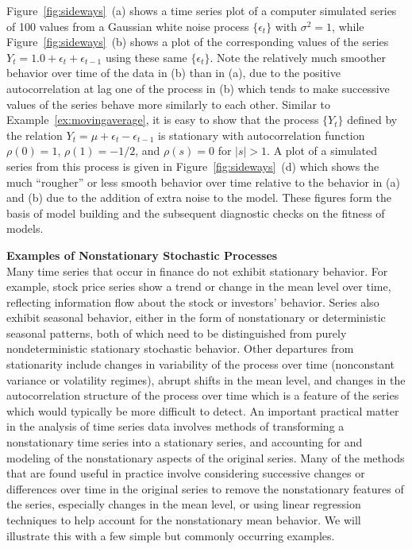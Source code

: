 \begin{ex}
Figure~\ref{fig:sideways}~(a) shows a time series plot of a computer simulated series of 100 values from a Gaussian white noise process $\{ \epsilon_t \}$ with $\sigma^2= 1$, while Figure~\ref{fig:sideways}~(b) shows a plot of the corresponding values of the series $Y_t = 1.0 + \epsilon_{t} + \epsilon_{t-1}$ using these same $\{\epsilon_t\}$.  Note the relatively much smoother behavior over time of the data in (b) than in (a), due to the positive autocorrelation at lag one of the process in (b) which tends to make successive values of the series behave more similarly to each other.  Similar to Example~\ref{ex:movingaverage}, it is easy to show that the process $\{Y_t\}$ defined by the relation $Y_t = \mu + \epsilon_{t} - \epsilon_{t-1}$ is stationary with autocorrelation function $\rho(0)=1$, $\rho(1)=-1/2$, and $\rho(s)=0$ for $|s|>1$. A plot of a simulated series from this process is given in Figure~\ref{fig:sideways}~(d) which shows the much ``rougher'' or less smooth behavior over time relative to the behavior  in (a) and (b) due to the addition of extra noise to the model. These figures form the basis of model building and the subsequent diagnostic checks on the fitness of models. \xqed
\end{ex} 


\noindent \textbf{Examples of Nonstationary Stochastic Processes} \\


Many time series that occur in finance do not exhibit stationary behavior.  For example, stock price series show a trend or change in the mean level over time, reflecting information flow about the stock or investors' behavior. Series also exhibit seasonal behavior, either in the form of nonstationary or deterministic seasonal patterns, both of which need to be distinguished from purely nondeterministic stationary stochastic behavior. Other departures from stationarity include changes in variability of the process over time (nonconstant variance or volatility regimes), abrupt shifts in the mean level, and changes in the autocorrelation structure of the process over time which is a feature of the series which would typically be more difficult to detect.  An important practical matter in the analysis of time series data involves methods of transforming a nonstationary time series into a stationary series, and accounting for and modeling of the nonstationary aspects of the original series. Many of the methods that are found useful in practice involve considering successive changes or differences over time in the original series to remove the nonstationary features of the series, especially changes in the mean level, or using linear regression techniques to help account for the nonstationary mean behavior.  We will illustrate this with a few simple but commonly occurring examples. 


